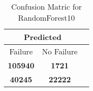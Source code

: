 \begin{table}[] 
\caption{Confusion Matric for RandomForest10} 
\label{Table: Prediction Accuracy-NoneRandomForest10OnlySunEKF-ignoreReflection-Reflection} 
\centering 
\begin{tabular} 
 {@{}ccc@{}} 
\toprule 
\multicolumn{2}{c}{\textbf{Predicted}}
 \\ \midrule 
\multicolumn{1}{|c|}{Failure} & 
\multicolumn{1}{c|}{No Failure}
 \\ \midrule 
\multicolumn{1}{|c|}{\color{green}\textbf{105940}} & 
\multicolumn{1}{c|}{\color{red}\textbf{1721}}
 \\ \midrule 
\multicolumn{1}{|c|}{\color{red}\textbf{40245}} & 
\multicolumn{1}{c|}{\color{green}\textbf{22222}}
 \\ \bottomrule 
\end{tabular} 
\end{table} 
